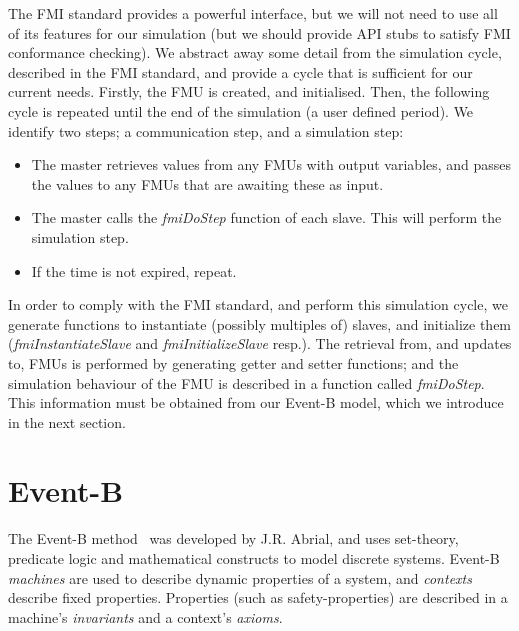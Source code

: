 \documentclass{llncs}%
\begin{document}
The FMI standard provides a powerful interface, but we will not need to use all of its features for our simulation (but we should provide API stubs to satisfy FMI conformance checking). We abstract away some detail from the simulation cycle, described in the FMI standard, and provide a cycle that is sufficient for our current needs. Firstly, the FMU is created, and initialised. Then, the following cycle is repeated until the end of the simulation (a user defined period). We identify two steps; a communication step, and a simulation step:
\vspace{-2pt}
\begin{itemize}[label=$\bullet$]
\item The master retrieves values from any FMUs with output variables, and passes the values to any FMUs that are awaiting these as input.
\item The master calls the \emph{fmiDoStep} function of each slave. This will perform the simulation step.
\item If the time is not expired, repeat.
\end{itemize}
%
 In order to comply with the FMI standard, and perform this simulation cycle, we generate functions to instantiate (possibly multiples of) slaves, and initialize them (\emph{fmiInstantiateSlave} and \emph{fmiInitializeSlave} resp.). The retrieval from, and updates to, FMUs is performed by generating getter and setter functions; and the simulation behaviour of the FMU is described in a function called \emph{fmiDoStep}. This information must be obtained from our Event-B model, which we introduce in the next section.

\section{Event-B}\label{EB}
%
The Event-B method~\cite{ABR10} was developed by J.R. Abrial, and uses set-theory, predicate logic and mathematical constructs to model discrete systems. Event-B \emph{machines} are used to describe dynamic properties of a system, and \emph{contexts} describe fixed properties. Properties (such as safety-properties) are described in a machine's \emph{invariants} and a context's \emph{axioms}. 
\end{document}
